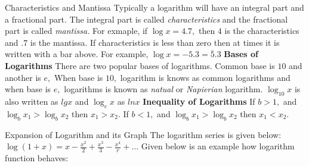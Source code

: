 \documentclass[aspectratio=1610,8pt]{beamer}
\begin{document}
\begin{frame}{Characteristics and Mantissa}
  Typically a logarithm will have an integral part and a fractional part. The integral part is called \textit{characteristics} and
  the fractional part is called \textit{mantissa.}
  \linebreak\linebreak
  For exmaple, if $\log x = 4.7,$ then $4$ is the characteristics and $.7$ is the mantissa. If characteristics is less than zero
  then at times it is written with a bar above. For example, $\log x = -5.3 = \overline{5}.3$
  \linebreak\linebreak
  \Large\textbf{Bases of Logarithms}
  \normalsize
  \linebreak\linebreak
  There are two popular bases of logarithms. Common base is $10$ and another is $e,$ When base is $10,$ logarithm is knows as
  common logarithms and when base is $e,$ logarithms is known as \textit{natual} or \textit{Napierian} logarithm.
  \linebreak\linebreak
  $\log_{10}x$ is also written as $lg x$ and $\log_e x$ as $ln x$
  \linebreak\linebreak
  \Large\textbf{Inequality of Logarithms}
  \normalsize
  \linebreak\linebreak
  If $b>1,$ and $\log_bx_1 > \log_bx_2$ then $x_1 > x_2.$ If $b < 1,$ and $\log_bx_1 > \log_bx_2$ then $x_1 < x_2.$
\end{frame}
\begin{frame}{Expansion of Logarithm and its Graph}
  The logarithm series is given below:
  \linebreak
  $\log(1 + x) = x - \frac{x^2}{2} + \frac{x^3}{3} - \frac{x^4}{r} + \ldots$
  Given below is an example how logarithm function behaves:
  \begin{center}
  \end{center}
\end{frame}
\end{document}
